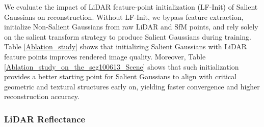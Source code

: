 \documentclass[letterpaper, 10 pt, conference]{ieeeconf}  %
\begin{document}
We evaluate the impact of LiDAR feature-point initialization (LF-Init) of Salient Gaussians on reconstruction. Without LF-Init, we bypass feature extraction, initialize Non-Salient Gaussians from raw LiDAR and SfM points, and rely solely on the salient transform strategy to produce Salient Gaussians during training. Table \ref{Ablation_study} shows that initializing Salient Gaussians with LiDAR feature points improves rendered image quality. Moreover, Table \ref{Ablation_study_on_the_seg100613_Scene} shows that such initialization provides a better starting point for Salient Gaussians to align with critical geometric and textural structures early on, yielding faster convergence and higher reconstruction accuracy.


\subsubsection{LiDAR Reflectance}
\end{document}
